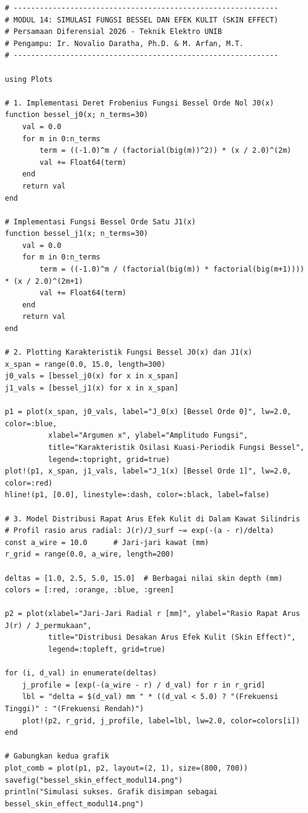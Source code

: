 \documentclass[11pt,a4paper]{article}
\theoremstyle{definition}
\begin{document}
\begin{lstlisting}[style=juliastyle, caption={Skrip Julia perhitungan Fungsi Bessel dan simulasi distribusi rapat arus efek kulit.}, label={lst:julia_bessel_skin}]
# -------------------------------------------------------------
# MODUL 14: SIMULASI FUNGSI BESSEL DAN EFEK KULIT (SKIN EFFECT)
# Persamaan Diferensial 2026 - Teknik Elektro UNIB
# Pengampu: Ir. Novalio Daratha, Ph.D. & M. Arfan, M.T.
# -------------------------------------------------------------

using Plots

# 1. Implementasi Deret Frobenius Fungsi Bessel Orde Nol J0(x)
function bessel_j0(x; n_terms=30)
    val = 0.0
    for m in 0:n_terms
        term = ((-1.0)^m / (factorial(big(m))^2)) * (x / 2.0)^(2m)
        val += Float64(term)
    end
    return val
end

# Implementasi Fungsi Bessel Orde Satu J1(x)
function bessel_j1(x; n_terms=30)
    val = 0.0
    for m in 0:n_terms
        term = ((-1.0)^m / (factorial(big(m)) * factorial(big(m+1)))) * (x / 2.0)^(2m+1)
        val += Float64(term)
    end
    return val
end

# 2. Plotting Karakteristik Fungsi Bessel J0(x) dan J1(x)
x_span = range(0.0, 15.0, length=300)
j0_vals = [bessel_j0(x) for x in x_span]
j1_vals = [bessel_j1(x) for x in x_span]

p1 = plot(x_span, j0_vals, label="J_0(x) [Bessel Orde 0]", lw=2.0, color=:blue,
          xlabel="Argumen x", ylabel="Amplitudo Fungsi",
          title="Karakteristik Osilasi Kuasi-Periodik Fungsi Bessel",
          legend=:topright, grid=true)
plot!(p1, x_span, j1_vals, label="J_1(x) [Bessel Orde 1]", lw=2.0, color=:red)
hline!(p1, [0.0], linestyle=:dash, color=:black, label=false)

# 3. Model Distribusi Rapat Arus Efek Kulit di Dalam Kawat Silindris
# Profil rasio arus radial: J(r)/J_surf ~= exp(-(a - r)/delta)
const a_wire = 10.0      # Jari-jari kawat (mm)
r_grid = range(0.0, a_wire, length=200)

deltas = [1.0, 2.5, 5.0, 15.0]  # Berbagai nilai skin depth (mm)
colors = [:red, :orange, :blue, :green]

p2 = plot(xlabel="Jari-Jari Radial r [mm]", ylabel="Rasio Rapat Arus J(r) / J_permukaan",
          title="Distribusi Desakan Arus Efek Kulit (Skin Effect)",
          legend=:topleft, grid=true)

for (i, d_val) in enumerate(deltas)
    j_profile = [exp(-(a_wire - r) / d_val) for r in r_grid]
    lbl = "delta = $(d_val) mm " * ((d_val < 5.0) ? "(Frekuensi Tinggi)" : "(Frekuensi Rendah)")
    plot!(p2, r_grid, j_profile, label=lbl, lw=2.0, color=colors[i])
end

# Gabungkan kedua grafik
plot_comb = plot(p1, p2, layout=(2, 1), size=(800, 700))
savefig("bessel_skin_effect_modul14.png")
println("Simulasi sukses. Grafik disimpan sebagai bessel_skin_effect_modul14.png")
\end{lstlisting}
\end{document}
